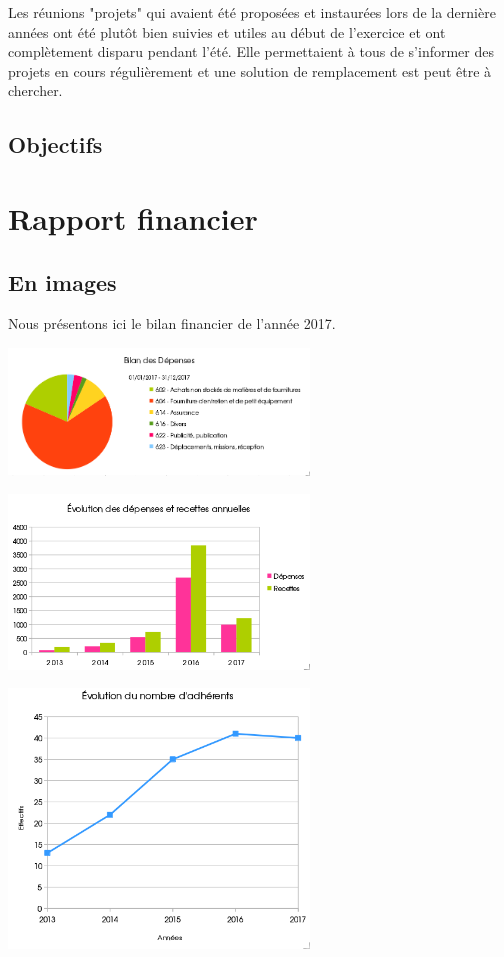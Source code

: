 \documentclass[11pt]{article}
\begin{document}
Les réunions "projets" qui avaient été proposées et instaurées lors de la dernière années
ont été plutôt bien suivies et utiles au début de l'exercice et ont complètement disparu
pendant l'été. Elle permettaient à tous de s'informer des projets en cours régulièrement
et une solution de remplacement est peut être à chercher.

\subsection{Objectifs}

\section{Rapport financier}

\subsection{En images}
Nous présentons ici le bilan financier de l'année 2017.
\begin{center}

\includegraphics[width=8cm]{2DossierAGDepenses2017.png}

\begin{multicols}{2}
\includegraphics[width=8cm]{3DossierAGGeneral2017.png}

\includegraphics[width=8cm]{4DossierAGAdherents2017.png}
\end{multicols}
\end{center}
\end{document}
